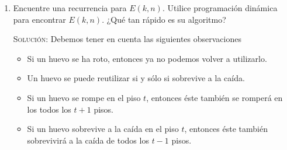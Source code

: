 \documentclass[letterpaper,11pt]{article}
\begin{document}
\begin{enumerate}
\begin{enumerate}
\begin{proof}
            Por lo tanto, el número mínimo de experimentos para determinar a 
            $f$ es $n$ si sólo tenemos un huevo. 

        \end{proof}

        Otra forma de ver este problema es que, como sólo tenemos un huevo, 
        entonces en el peor caso necesitamos tirar $n$ veces el huevo para 
        encontrar a $f$ (pues comenzamos desde el piso $1$ y terminamos 
        en el piso $n$). Debemos avanzar piso por piso ya que si lo hacemos 
        de otra forma (de dos en dos, por ejemplo) no tenemos forma de saber 
        en qué piso se rompe el huevo. De esta forma, $E(1, n) = n$.

        \item Encuentre una recurrencia para $E(k,n)$. Utilice programación 
        dinámica para encontrar $E(k,n)$. ¿Qué tan rápido es su algoritmo?

        \textsc{Solución:} Debemos tener en cuenta las siguientes 
        observaciones 
        \begin{itemize}
            \item Si un huevo se ha roto, entonces ya no podemos volver a 
            utilizarlo.

            \item Un huevo se puede reutilizar si y sólo si sobrevive a 
            la caída. 

            \item Si un huevo se rompe en el piso $t$, entonces éste también 
            se romperá en los todos los $t+1$ pisos.

            \item Si un huevo sobrevive a la caída en el piso $t$, entonces 
            éste también sobrevivirá a la caída de todos los $t-1$ pisos.
        \end{itemize}


\end{enumerate}
\end{enumerate}
\end{document}
